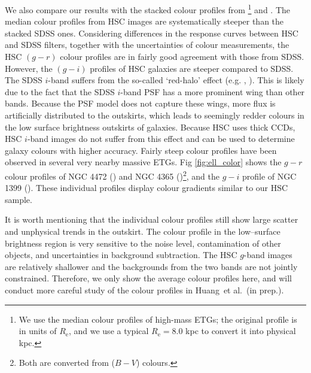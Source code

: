 \documentclass[fleqn,usenatbib]{mnras}
\def\etal{{\ et al.~}}
\begin{document}
    We also compare our results with the stacked colour profiles from  
    \citealt{LaBarbera2010}\footnote{We use the median colour profiles of high-mass 
    ETGs; the original profile is in units of $R_{\mathrm{e}}$, and we use a typical 
    $R_{\mathrm{e}}=8.0$ kpc to convert it into physical kpc.} and 
    \citealt{DSouza2014}.
    The median colour profiles from HSC images are systematically steeper than the 
    stacked SDSS ones. 
    Considering differences in the response curves between HSC and SDSS filters, 
    together with the uncertainties of colour measurements, the HSC $(g-r)$ colour 
    profiles are in fairly good agreement with those from SDSS. 
    However, the $(g-i)$ profiles of HSC galaxies are steeper compared to SDSS. 
    The SDSS $i$-band suffers from the so-called `red-halo' effect
    (e.g. \citealt{Wu2005}, \citealt{Tal2011}).  
    This is likely due to the fact that the SDSS $i$-band PSF has a more prominent 
    wing than other bands. 
    Because the PSF model does not capture these wings, more flux is artificially 
    distributed to the outskirts, which leads to seemingly redder colours in the low 
    surface brightness outskirts of galaxies. 
    Because HSC uses thick CCDs, HSC $i$-band images do not suffer from this effect 
    and can be used to determine galaxy colours with higher accuracy. 
    Fairly steep colour profiles have been observed in several very nearby massive 
    ETGs.  
    Fig \ref{fig:ell_color} shows the $g-r$ colour profiles of NGC 4472 
    (\citealt{Mihos2013}) and NGC 4365 (\citealt{Mihos2017})\footnote{
    Both are converted from ($B-V$) colours.}, and the $g-i$ profile of NGC 1399 
    (\citealt{Iodice2016}). 
    These individual profiles display colour gradients similar to our HSC sample.  
   
    It is worth mentioning that the individual colour profiles still show large 
    scatter and unphysical trends in the outskirt.  
    The colour profile in the low--surface brightness region is very sensitive to 
    the noise level, contamination of other objects, and uncertainties in background 
    subtraction. 
    The HSC $g$-band images are relatively shallower and the backgrounds from the
    two bands are not jointly constrained. 
    Therefore, we only show the average colour profiles here, and will conduct 
    more careful study of the colour profiles in Huang\etal (in prep.).
    
    
\end{document}
